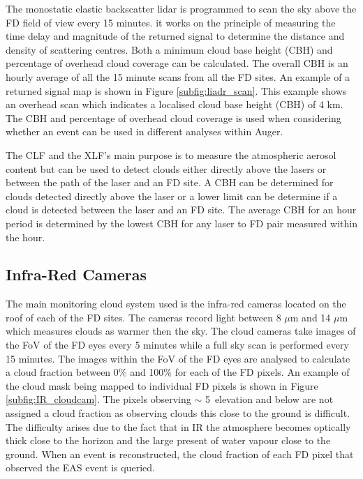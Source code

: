 The monostatic elastic backscatter lidar is programmed to scan the sky above the FD field of view every 15 minutes. it works on the principle of measuring the time delay and magnitude of the returned signal to determine the distance and density of scattering centres. Both a minimum cloud base height (CBH) and percentage of overhead cloud coverage can be calculated. The overall CBH is an hourly average of all the 15 minute scans from all the FD sites. An example of a returned signal map is shown in Figure \ref{subfig:liadr_scan}. This example shows an overhead scan which indicates a localised cloud base height (CBH) of 4 km. The CBH and percentage of overhead cloud coverage is used when considering whether an event can be used in different analyses within Auger.


The CLF and the XLF's main purpose is to measure the atmospheric aerosol content but can be used to detect clouds either directly above the lasers or between the path of the laser and an FD site. A CBH can be determined for clouds detected directly above the laser or a lower limit can be determine if a cloud is detected between the laser and an FD site. The average CBH for an hour period is determined by the lowest CBH for any laser to FD pair measured within the hour.


\subsection{Infra-Red Cameras}

The main monitoring cloud system used is the infra-red cameras located on the roof of each of the FD sites. The cameras record light between 8 $\mu$m and 14 $\mu$m which measures clouds as warmer then the sky. The cloud cameras take images of the FoV of the FD eyes every 5 minutes while a full sky scan is performed every 15 minutes. The images within the FoV of the FD eyes are analysed to calculate a cloud fraction between 0\% and 100\% for each of the FD pixels. An example of the cloud mask being mapped to individual FD pixels is shown in Figure \ref{subfig:IR_cloudcam}. The pixels observing $\sim$ 5\textdegree \ elevation and below are not assigned a cloud fraction as observing clouds this close to the ground is difficult. The difficulty arises due to the fact that in IR the atmosphere becomes optically thick close to the horizon and the large present of water vapour close to the ground. When an event is reconstructed, the cloud fraction of each FD pixel that observed the EAS event is queried.

